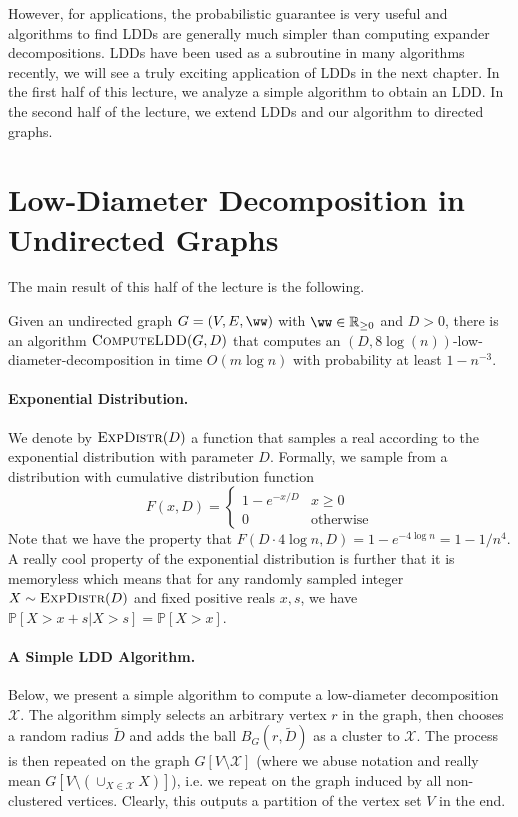 However, for applications, the probabilistic guarantee is very useful and algorithms to find LDDs are generally much simpler than computing expander decompositions. LDDs have been used as a subroutine in many algorithms recently, we will see a truly exciting application of LDDs in the next chapter. In the first half of this lecture, we analyze a simple algorithm to obtain an LDD. In the second half of the lecture, we extend LDDs and our algorithm to directed graphs.

\section{Low-Diameter Decomposition in Undirected Graphs}

The main result of this half of the lecture is the following.

\begin{theorem}\label{thm:computeLDDguarantees}
Given an undirected graph $G = (V,E,\ww)$ with $\ww \in \mathbb{R}_{\geq 0}$ and $D > 0$, there is an algorithm $\textsc{ComputeLDD}(G, D)$ that computes an $(D,  8 \log(n))$-low-diameter-decomposition in time $O(m \log n)$ with probability at least $1-n^{-3}$. 
\end{theorem}

\paragraph{Exponential Distribution.} We denote by $\textsc{ExpDistr}(D)$ a function that samples a real according to the exponential distribution with parameter $D$.  Formally, we sample from a distribution with cumulative distribution function
\[
	F(x, D) = \begin{cases} 1 - e^{-x/D} & x \geq 0 \\ 0 & \text{otherwise} \end{cases}
\]
Note that we have the property that $F(D \cdot 4\log n,  D) = 1 - e^{-4\log n} = 1-1/n^4$.  A really cool property of the exponential distribution is further that it is memoryless which means that for any randomly sampled integer $X \sim \textsc{ExpDistr}(D)$ and fixed positive reals $x,s$, we have $\mathbb{P}[X > x + s | X > s] = \mathbb{P}[X > x]$.

\paragraph{A Simple LDD Algorithm.} Below, we present a simple algorithm to compute a low-diameter decomposition $\mathcal{X}$. The algorithm simply selects an arbitrary vertex $r$ in the graph, then chooses a random radius $\tilde{D}$ and adds the ball $B_{G}(r, \tilde{D})$ as a cluster to $\mathcal{X}$. The process is then repeated on the graph $G[V \setminus \mathcal{X}]$ (where we abuse notation and really mean $G[V \setminus (\cup_{X \in \mathcal{X}} X)]$), i.e. we repeat on the graph induced by all non-clustered vertices. Clearly, this outputs a partition of the vertex set $V$ in the end.


